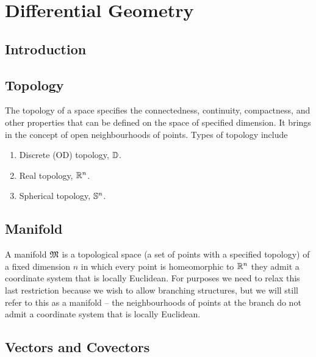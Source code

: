 \chapter{Differential Geometry}
\label{cha:differentialgeometry}

\section{Introduction}

\section{Topology}

The topology of a space specifies the connectedness, continuity, compactness,
and other properties that can be defined on the space of specified
dimension. It brings in the concept of open neighbourhoods of points. Types of
topology include

\begin{enumerate}
\item Discrete (OD) topology, $\dntopology{}$.
\item Real topology, $\rntopology{n}$.
\item Spherical topology, $\sntopology{n}$.
\end{enumerate}

\section{Manifold}

A manifold $ \mathfrak{M} $ is a topological space (\ie a set of points with a specified
topology) of a fixed dimension $n$ in which every point is homeomorphic to
$\rntopology{n}$ \ie they admit a coordinate system that is locally
Euclidean. For \FieldML purposes we need to relax this last restriction because
we wish to allow branching structures, but we will still refer to this as a
manifold – the neighbourhoods of points at the branch do not admit a
coordinate system that is locally Euclidean.

\section{Vectors and Covectors}

